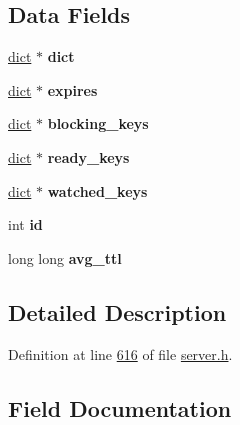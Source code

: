\subsection*{Data Fields}
\begin{DoxyCompactItemize}
\item 
\mbox{\label{structredisDb_a4aa609472e0e77d19c87c8a42d94f4a1}} 
\hyperlink{structdict}{dict} $\ast$ {\bfseries dict}
\item 
\mbox{\label{structredisDb_aad4a31e9cd97357d99a66c29bd189bc7}} 
\hyperlink{structdict}{dict} $\ast$ {\bfseries expires}
\item 
\mbox{\label{structredisDb_af2a5d2caa663419eb274c9ff07356043}} 
\hyperlink{structdict}{dict} $\ast$ {\bfseries blocking\+\_\+keys}
\item 
\mbox{\label{structredisDb_afdf1927ac43c1249fce9e42ef5c00f83}} 
\hyperlink{structdict}{dict} $\ast$ {\bfseries ready\+\_\+keys}
\item 
\mbox{\label{structredisDb_a576dec372ec0191a1242557823be6326}} 
\hyperlink{structdict}{dict} $\ast$ {\bfseries watched\+\_\+keys}
\item 
\mbox{\label{structredisDb_a0c85effb7de0bae1dd2df7c28b4184cd}} 
int {\bfseries id}
\item 
\mbox{\label{structredisDb_ae663a7e37b7ba585c71e8ca01091813a}} 
long long {\bfseries avg\+\_\+ttl}
\end{DoxyCompactItemize}


\subsection{Detailed Description}


Definition at line \hyperlink{server_8h_source_l00616}{616} of file \hyperlink{server_8h_source}{server.\+h}.



\subsection{Field Documentation}
\mbox{\label{structredisDb_ae663a7e37b7ba585c71e8ca01091813a}} 
